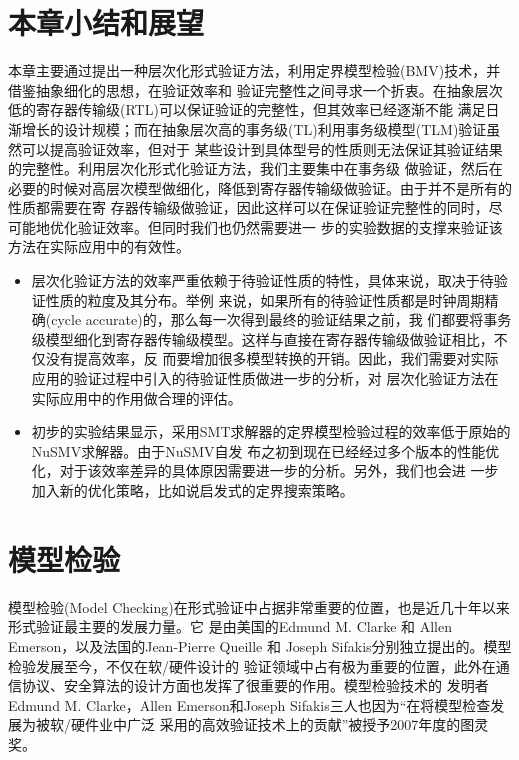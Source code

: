 

\section{本章小结和展望}
\label{sec:conclude_hierarchy}

本章主要通过提出一种层次化形式验证方法，利用定界模型检验(BMV)技术，并借鉴抽象细化的思想，在验证效率和
验证完整性之间寻求一个折衷。在抽象层次低的寄存器传输级(RTL)可以保证验证的完整性，但其效率已经逐渐不能
满足日渐增长的设计规模；而在抽象层次高的事务级(TL)利用事务级模型(TLM)验证虽然可以提高验证效率，但对于
某些设计到具体型号的性质则无法保证其验证结果的完整性。利用层次化形式化验证方法，我们主要集中在事务级
做验证，然后在必要的时候对高层次模型做细化，降低到寄存器传输级做验证。由于并不是所有的性质都需要在寄
存器传输级做验证，因此这样可以在保证验证完整性的同时，尽可能地优化验证效率。但同时我们也仍然需要进一
步的实验数据的支撑来验证该方法在实际应用中的有效性。

\begin{itemize}
\item 层次化验证方法的效率严重依赖于待验证性质的特性，具体来说，取决于待验证性质的粒度及其分布。举例
  来说，如果所有的待验证性质都是时钟周期精确(cycle accurate)的，那么每一次得到最终的验证结果之前，我
  们都要将事务级模型细化到寄存器传输级模型。这样与直接在寄存器传输级做验证相比，不仅没有提高效率，反
  而要增加很多模型转换的开销。因此，我们需要对实际应用的验证过程中引入的待验证性质做进一步的分析，对
  层次化验证方法在实际应用中的作用做合理的评估。
\item 初步的实验结果显示，采用SMT求解器的定界模型检验过程的效率低于原始的NuSMV求解器。由于NuSMV自发
  布之初到现在已经经过多个版本的性能优化，对于该效率差异的具体原因需要进一步的分析。另外，我们也会进
  一步加入新的优化策略，比如说启发式的定界搜索策略。
\end{itemize}

\section{模型检验}
\label{sec:model-checking}

模型检验(Model Checking)在形式验证中占据非常重要的位置，也是近几十年以来形式验证最主要的发展力量。它
是由美国的Edmund M. Clarke 和 Allen Emerson\cite{WLP81_Clarke}，以及法国的Jean-Pierre
Queille 和 Joseph Sifakis\cite{EWATPN81_Queille}分别独立提出的。模型检验发展至今，不仅在软/硬件设计的
验证领域中占有极为重要的位置，此外在通信协议、安全算法的设计方面也发挥了很重要的作用。模型检验技术的
发明者Edmund M. Clarke，Allen Emerson和Joseph Sifakis三人也因为``在将模型检查发展为被软/硬件业中广泛
采用的高效验证技术上的贡献''被授予2007年度的图灵奖。

